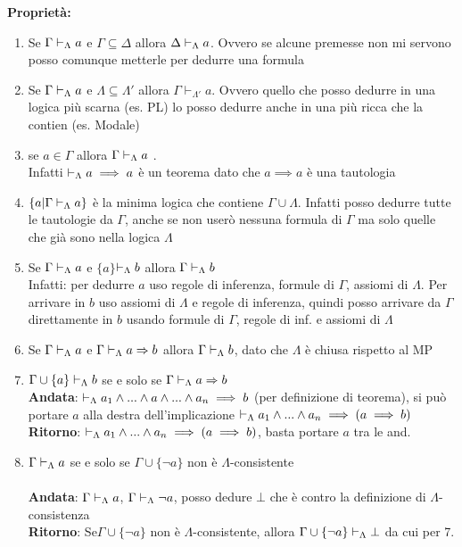 \textbf{Proprietà:} $ $
\begin{enumerate}
\item Se $\Gamma\vdash_{\Lambda}a$ e $\Gamma\subseteq\Delta$ allora $\Delta\vdash_{\Lambda}a$.
Ovvero se alcune premesse non mi servono posso comunque metterle per
dedurre una formula 
\item Se $\Gamma\vdash_{\Lambda}a$ e $\Lambda\subseteq\Lambda'$ allora $\Gamma\vdash_{\Lambda'}a$.
Ovvero quello che posso dedurre in una logica più scarna (es. PL)
lo posso dedurre anche in una più ricca che la contien (es. Modale) 
\item se $a\in\Gamma$ allora $\Gamma\vdash_{\Lambda}a$ . \\
 Infatti $\vdash_{\Lambda}a\implies a$ è un teorema dato che $a\implies a$
è una tautologia 
\item $\{a|\Gamma\vdash_{\Lambda}a\}$ è la minima logica che contiene $\Gamma\cup\Lambda$.
Infatti posso dedurre tutte le tautologie da $\Gamma$, anche se non
userò nessuna formula di $\Gamma$ ma solo quelle che già sono nella
logica $\Lambda$ $ $
\item Se $\Gamma\vdash_{\Lambda}a$ e $\{a\}$$\vdash_{\Lambda}b$ allora $\Gamma\vdash_{\Lambda}b$ \\
 Infatti: per dedurre $a$ uso regole di inferenza, formule di $\Gamma$,
assiomi di $\Lambda$. Per arrivare in $b$ uso assiomi di $\Lambda$
e regole di inferenza, quindi posso arrivare da $\Gamma$ direttamente
in $b$ usando formule di $\Gamma$, regole di inf. e assiomi di $\Lambda$ 
\item Se $\Gamma\vdash_{\Lambda}a$ e $\Gamma\vdash_{\Lambda}a\Rightarrow b$ allora $\Gamma\vdash_{\Lambda}b$, dato
che $\Lambda$ è chiusa rispetto al MP 
\item $\Gamma\cup\{a\}\vdash_{\Lambda}b$ se e solo se $\Gamma\vdash_{\Lambda}a\Rightarrow b$
\\
 \textbf{Andata}: $\vdash_{\Lambda}a_{1}\wedge...\wedge a\wedge...\wedge a_{n}\implies b$
(per definizione di teorema), si può portare $a$ alla destra dell'implicazione
$\vdash_{\Lambda}a_{1}\wedge...\wedge a_{n}\implies(a\implies b)$ \\
 \textbf{Ritorno}: $\vdash_{\Lambda}a_{1}\wedge...\wedge a_{n}\implies(a\implies b)$,
basta portare $a$ tra le $ $and. 
\item $\Gamma\vdash_{\Lambda}a$ se e solo se $\Gamma\cup\{\neg a\}$ non è $\Lambda$-consistente
\\
 \\
 \textbf{Andata}: $\Gamma\vdash_{\Lambda}a$, $\Gamma\vdash_{\Lambda}\neg a$, posso dedure
$\bot$ che è contro la definizione di $\Lambda$-consistenza\\
 \textbf{Ritorno}: Se$ $$\Gamma\cup\{\neg a\}$ non è $\Lambda$-consistente,
allora $\Gamma\cup\{\neg a\}\vdash_{\Lambda}\bot$ da cui per 7. \\

\end{enumerate}
